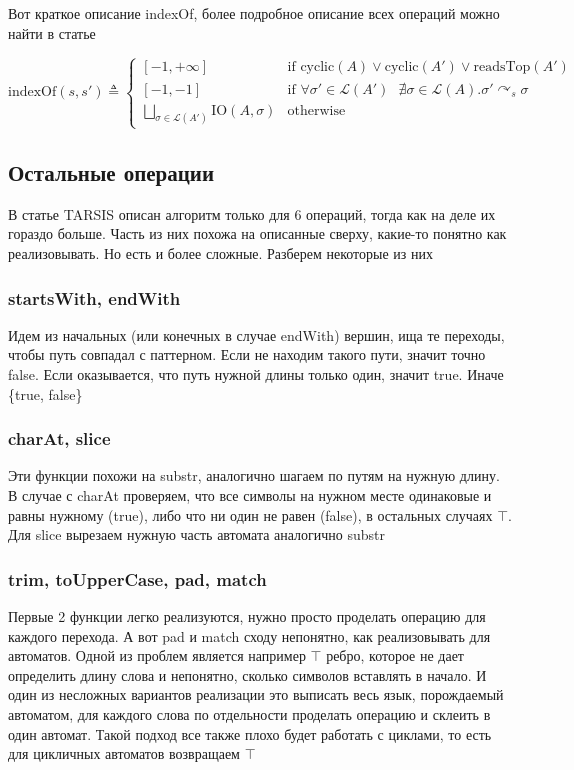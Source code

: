 Вот краткое описание indexOf, более подробное описание всех операций можно найти в статье~\cite{tarsis2021}

$$
\text{indexOf}(s, s') \triangleq 
\begin{cases}
[-1, +\infty] & \text{if } \text{cyclic}(A) \lor \text{cyclic}(A') \lor \text{readsTop}(A') \\
[-1, -1] & \text{if } \forall \sigma' \in \mathcal{L}(A') \text{ } \nexists \sigma \in \mathcal{L}(A). \sigma' \curvearrowright_s \sigma \\
\underset{\sigma \in \mathcal{L}(A')}{\bigsqcup} \text{IO}(A, \sigma) & \text{otherwise}
\end{cases}
$$

\subsection{Остальные операции}
В статье TARSIS описан алгоритм только для 6 операций, тогда как на деле их гораздо больше. Часть из них похожа на описанные сверху, какие-то понятно как реализовывать. Но есть и более сложные. Разберем некоторые из них

\subsubsection*{startsWith, endWith}
Идем из начальных (или конечных в случае endWith) вершин, ища те переходы, чтобы путь совпадал с паттерном. Если не находим такого пути, значит точно false. Если оказывается, что путь нужной длины только один, значит true. Иначе \{true, false\}

\subsubsection*{charAt, slice}
Эти функции похожи на substr, аналогично шагаем по путям на нужную длину. В случае с charAt проверяем, что все символы на нужном месте одинаковые и равны нужному (true), либо что ни один не равен (false), в остальных случаях $\top$. Для slice вырезаем нужную часть автомата аналогично substr

\subsubsection*{trim, toUpperCase, pad, match}
Первые 2 функции легко реализуются, нужно просто проделать операцию для каждого перехода. А вот pad и match сходу непонятно, как реализовывать для автоматов. Одной из проблем является например $\top$ ребро, которое не дает определить длину слова и непонятно, сколько символов вставлять в начало. И один из несложных вариантов реализации это выписать весь язык, порождаемый автоматом, для каждого слова по отдельности проделать операцию и склеить в один автомат. Такой подход все также плохо будет работать с циклами, то есть для цикличных автоматов возвращаем $\top$

